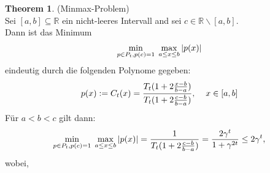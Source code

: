 \documentclass[12pt,a4paper,numbers=endperiod]{scrartcl}
\theoremstyle{definition}
\newtheorem{theo}[satz]{Theorem}
\def\RR{{\mathbb R}}
\begin{document}
\begin{theo} (Minmax-Problem) 
	$ $\\
	Sei $[a,b] \subseteq \RR$ ein nicht-leeres Intervall and sei $c \in \RR \backslash [a,b]$.\\
	Dann ist das Minimum
	\begin{gather}
	\min\limits_{p \in P_t, p(c) = 1} \hspace{1mm} \max\limits_{a \leq x \leq b} |p(x)|
	\end{gather}
	eindeutig durch die folgenden Polynome gegeben:
	\begin{gather}
	p(x) := C_t(x) = \frac{T_t(1+ 2 \frac{x-b}{b-a})}{T_t(1+ 2 \frac{c-b}{b-a})}, \hspace{4mm} x \in [a,b]
	\end{gather}
	Für $a < b < c$ gilt dann: 
	\begin{gather}
		\min\limits_{p \in P_t, p(c) = 1} \hspace{1mm} \max\limits_{a \leq x \leq b} |p(x)| = \frac{1}{T_t(1 + 2\frac{c-b}{b-a})} = \frac{2 \gamma^t}{1+ \gamma^{2t}} \leq 2 \gamma^t,
	\end{gather}
	wobei,  \\
\end{theo}
\newpage
\end{document}
